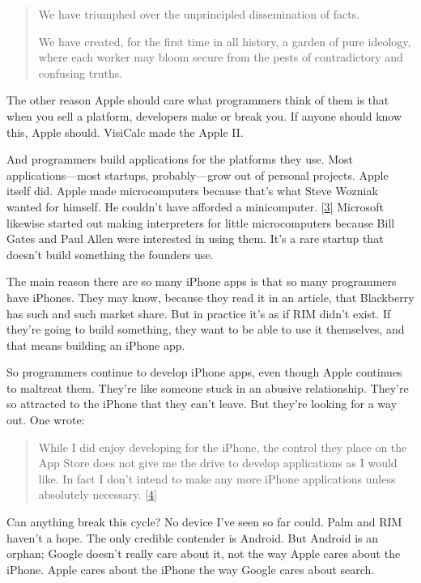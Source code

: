 \begin{quote}
We have triumphed over the unprincipled dissemination of facts.

We have created, for the first time in all history, a garden of pure
ideology, where each worker may bloom secure from the pests of
contradictory and confusing truths.
\end{quote}

The other reason Apple should care what programmers think of them is
that when you sell a platform, developers make or break you. If anyone
should know this, Apple should. VisiCalc made the Apple II.

And programmers build applications for the platforms they use. Most
applications---most startups, probably---grow out of personal projects.
Apple itself did. Apple made microcomputers because that's what Steve
Wozniak wanted for himself. He couldn't have afforded a minicomputer.
{[}\hyperref[f3n]{3}{]} Microsoft likewise started out making
interpreters for little microcomputers because Bill Gates and Paul Allen
were interested in using them. It's a rare startup that doesn't build
something the founders use.

The main reason there are so many iPhone apps is that so many
programmers have iPhones. They may know, because they read it in an
article, that Blackberry has such and such market share. But in practice
it's as if RIM didn't exist. If they're going to build something, they
want to be able to use it themselves, and that means building an iPhone
app.

So programmers continue to develop iPhone apps, even though Apple
continues to maltreat them. They're like someone stuck in an abusive
relationship. They're so attracted to the iPhone that they can't leave.
But they're looking for a way out. One wrote:

\begin{quote}
While I did enjoy developing for the iPhone, the control they place on
the App Store does not give me the drive to develop applications as I
would like. In fact I don't intend to make any more iPhone applications
unless absolutely necessary. {[}\hyperref[f4n]{4}{]}
\end{quote}

Can anything break this cycle? No device I've seen so far could. Palm
and RIM haven't a hope. The only credible contender is Android. But
Android is an orphan; Google doesn't really care about it, not the way
Apple cares about the iPhone. Apple cares about the iPhone the way
Google cares about search.

